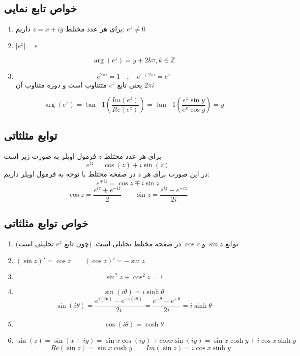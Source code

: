 \documentclass[12pt]{report}
\begin{document}
 	 	 	  \subsection{خواص تابع نمایی}
 	 	 	  \begin{enumerate}
 	 	 	  	\item 
 	 	 	  	برای هر عدد مختلط
 	 	 	  	$z = x + iy$
 	 	 	  	داریم: 
 	 	 	  	$e^z \neq 0$
 	 	 	  	\item
 	 	 	  	$|e^z| = e$
 	 	 	  	
 	 	 	  	$$\arg(e^z) = y + 2k\pi , k \in \mathbb{Z}$$
 	 	 	  	\item
 	 	 	  	$$e^{2\pi i } = 1 \quad, \quad e^{z +2\pi i} = e^z$$
 	 	 	  	یعنی تابع
 	 	 	  	$e^z$
 	 	 	  	متتناوب است و دوره متناوب آن 
 	 	 	  	$2 \pi i$
 	 	 	  	
 	 	 	  	$$\arg(e^z) = \tan^-1(\frac{Im(e^z)}{Re(e^z)}) = \tan^-1(\frac{e^x \sin y}{e^x \cos y }) = y$$
 	 	 	  	
 	 	 	  \end{enumerate}
 	 	 	  
 	 	 	  \subsection{توابع مثلثاتی}
 	 	 	  برای هر عدد مختلط
 	 	 	  $z$
 	 	 	  فرمول اویلر به صورت زیر است
 	 	 	  $$e^{iz} = \cos(z)+i \sin(z)$$
 	 	 	  در این صورت  برای هر 
 	 	 	  $z$
 	 	 	  در صفحه مختلط با توجه به فرمول اویلر داریم:
 	 	 	  $$e^{\mp iz} = \cos z \mp i\sin z$$
 	 	 	  $$\cos z = \frac{e^{iz} + e^{-iz}}{2} \qquad \sin z = \frac{e^{iz} - e^{-iz}}{2i}$$
 	 	 	  
 	 	 	  \subsection{خواص توابع مثلثاتی}
 	 	 	  \begin{enumerate}
 	 	 	  	\item 
 	 	 	  	توابع 
 	 	 	  	$\sin z$
 	 	 	  	و
 	 	 	  	$\cos z$
 	 	 	  	در صفحه مختلط تحلیلی است.
 	 	 	  (چون تابع 
 	 	 	  $e^z$
 	 	 	  تحلیلی است)
 	 	 	  \item
 	 	 	  $(\sin z)' = \cos z \qquad (\cos z)' = - \sin z$
 	 	 	  \item
 	 	 	  $$\sin^2 z + \cos^2 z = 1$$
 	 	 	  \item
 	 	 	  $$\sin (i\theta) = i \sinh \theta$$
 	 	 	  $$\sin (i\theta) = \frac{e^{i(i\theta)} - e^{-i(i\theta)}}{2i} = \frac{e^{-\theta} - e^{+\theta}}{2i} = i\sinh \theta$$
 	 	 	  \item
 	 	 	  $$\cos (i\theta) =  \cosh \theta$$
 	 	 	  \item
 	 	 	  $$\sin(z) = \sin(x + iy)  = \sin x \cos(iy)  +cos x \sin(iy) = \sin x \cosh y + i \cos x \sinh y$$
 	 	 	  $$\qquad Re(\sin z) = \sin x \cosh y \qquad Im(\sin z) = i\cos x \sinh y$$
 	 	 	  
 	 	 	  
 	 	 	  \end{enumerate}
\end{document}
